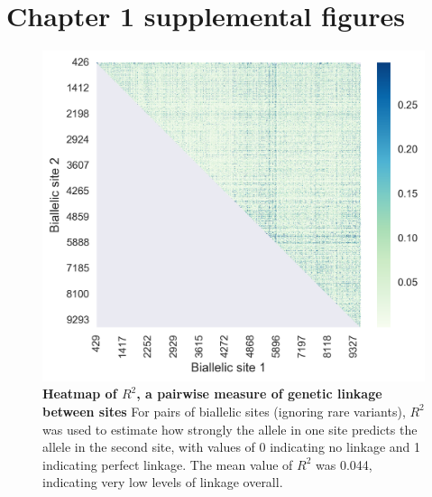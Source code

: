 \chapter{Chapter 1 supplemental figures}

\begin{figure}[ht!]
  \begin{centering}
    \includegraphics[width=.8\linewidth]{./png/siv_linkage.png}
  	\caption[Heatmap of $R^2$, a pairwise measure of genetic linkage between sites]{\textbf{Heatmap of $R^2$, a pairwise measure of genetic linkage between sites }
For pairs of biallelic sites (ignoring rare variants), $R^2$ was used to estimate how strongly the allele in one site predicts the allele in the second site, with values of 0 indicating no linkage and 1 indicating perfect linkage.
The mean value of $R^2$ was 0.044, indicating very low levels of linkage overall.
        }
  	\label{siv_linkage}
  \end{centering}
\end{figure}

